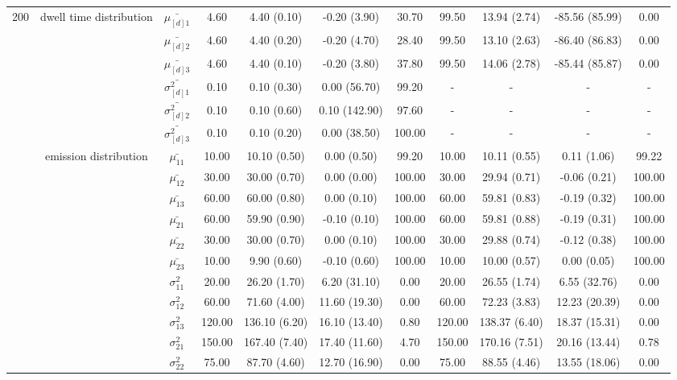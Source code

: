 \begin{table}[h]
{\begin{tabular}{ccccccccccc}
200 & dwell time distribution & $\bar{\mu_{[d]1}}$ & 4.60 & 4.40 (0.10) & -0.20 (3.90) & 30.70 & 99.50 & 13.94 (2.74) & -85.56 (85.99) & 0.00 \\
\multirow{26}{*}{} & \multirow{5}{*}{} & $\bar{\mu_{[d]2}}$ & 4.60 & 4.40 (0.20) & -0.20 (4.70) & 28.40 & 99.50 & 13.10 (2.63) & -86.40 (86.83) & 0.00 \\
 &  & $\bar{\mu_{[d]3}}$ & 4.60 & 4.40 (0.10) & -0.20 (3.80) & 37.80 & 99.50 & 14.06 (2.78) & -85.44 (85.87) & 0.00 \\
 &  & $\bar{\sigma^2_{[d]1}}$ & 0.10 & 0.10 (0.30) & 0.00 (56.70) & 99.20 & - & - & - & - \\
 &  & $\bar{\sigma^2_{[d]2}}$ & 0.10 & 0.10 (0.60) & 0.10 (142.90) & 97.60 & - & - & - & - \\
 &  & $\bar{\sigma^2_{[d]3}}$ & 0.10 & 0.10 (0.20) & 0.00 (38.50) & 100.00 & - & - & - & - \\
 & emission distribution & $\bar{\mu_{11}}$ & 10.00 & 10.10 (0.50) & 0.00 (0.50) & 99.20 & 10.00 & 10.11 (0.55) & 0.11 (1.06) & 99.22 \\
 & \multirow{11}{*}{} & $\bar{\mu_{12}}$ & 30.00 & 30.00 (0.70) & 0.00 (0.00) & 100.00 & 30.00 & 29.94 (0.71) & -0.06 (0.21) & 100.00 \\
 &  & $\bar{\mu_{13}}$ & 60.00 & 60.00 (0.80) & 0.00 (0.10) & 100.00 & 60.00 & 59.81 (0.83) & -0.19 (0.32) & 100.00 \\
 &  & $\bar{\mu_{21}}$ & 60.00 & 59.90 (0.90) & -0.10 (0.10) & 100.00 & 60.00 & 59.81 (0.88) & -0.19 (0.31) & 100.00 \\
 &  & $\bar{\mu_{22}}$ & 30.00 & 30.00 (0.70) & 0.00 (0.10) & 100.00 & 30.00 & 29.88 (0.74) & -0.12 (0.38) & 100.00 \\
 &  & $\bar{\mu_{23}}$ & 10.00 & 9.90 (0.60) & -0.10 (0.60) & 100.00 & 10.00 & 10.00 (0.57) & 0.00 (0.05) & 100.00 \\
 &  & $\sigma^2_{11}$ & 20.00 & 26.20 (1.70) & 6.20 (31.10) & 0.00 & 20.00 & 26.55 (1.74) & 6.55 (32.76) & 0.00 \\
 &  & $\sigma^2_{12}$ & 60.00 & 71.60 (4.00) & 11.60 (19.30) & 0.00 & 60.00 & 72.23 (3.83) & 12.23 (20.39) & 0.00 \\
 &  & $\sigma^2_{13}$ & 120.00 & 136.10 (6.20) & 16.10 (13.40) & 0.80 & 120.00 & 138.37 (6.40) & 18.37 (15.31) & 0.00 \\
 &  & $\sigma^2_{21}$ & 150.00 & 167.40 (7.40) & 17.40 (11.60) & 4.70 & 150.00 & 170.16 (7.51) & 20.16 (13.44) & 0.78 \\
 &  & $\sigma^2_{22}$ & 75.00 & 87.70 (4.60) & 12.70 (16.90) & 0.00 & 75.00 & 88.55 (4.46) & 13.55 (18.06) & 0.00 \\

\end{tabular}}
\end{table}
